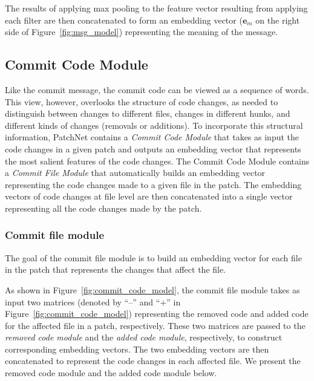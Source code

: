\noindent
The results of applying max pooling to the feature vector resulting from
applying each filter are then concatenated to form an embedding vector
($\mathbf{e}_m$ on the right side of Figure~\ref{fig:msg_model})
representing the meaning of the message.

\subsection{Commit Code Module}
\label{sec:commit_code_model}
Like the commit message,
the commit code can be viewed as a sequence of words. This view, however, overlooks the structure of code changes, as needed to distinguish between changes to different files, changes in
different hunks, and different kinds of changes (removals or additions). To incorporate this structural information, PatchNet contains a {\em Commit Code Module} that takes as input the code changes in a given patch and outputs an embedding vector that represents the most salient features of the code changes. The Commit Code Module contains a {\em Commit File Module} that automatically builds an embedding vector representing the code changes made to a given file in the patch. The embedding vectors of code changes at file level are then concatenated into a single vector representing all the code changes made by the patch.

\subsubsection{Commit file module}
\label{sec:code_file_framework}

The goal of the commit file module is to build an embedding vector
for each file in the patch that represents the changes that affect the file.

As shown in Figure~\ref{fig:commit_code_model}, the commit file module
takes as input two matrices (denoted by ``--'' and ``+'' in
Figure~\ref{fig:commit_code_model}) representing the removed code and added
code for the affected file in a patch, respectively. These two matrices
are passed to the \textit{removed code module} and the \textit{added code
module}, respectively, to construct corresponding embedding vectors. The two embedding vectors are then concatenated to represent the code changes in each affected file. We present the removed code module and the added code module below.


